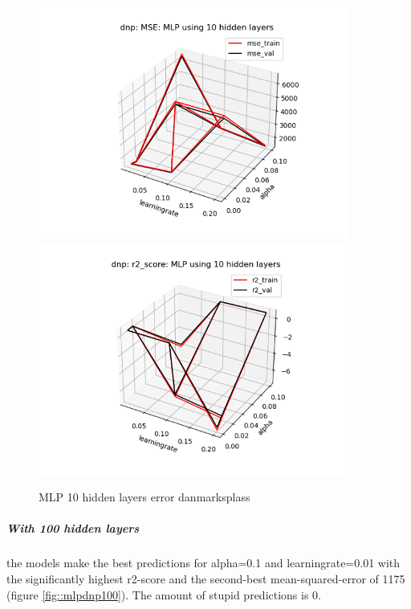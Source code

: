 \documentclass[12pt,a4paper]{scrartcl}		%
\begin{document}
\begin{figure}[h]
    \centering
    \includegraphics[scale = 1.1]{dnp_mlp_mse_10.png}
    \includegraphics[scale = 1.1]{dnp_mlp_r2_10.png}
    \caption{MLP 10 hidden layers error danmarksplass}
    \label{fig::mlpdnp10}
\end{figure}

\subparagraph{With 100 hidden layers}
the models make the best predictions for alpha=0.1 and learningrate=0.01 with the significantly highest r2-score and the second-best mean-squared-error of 1175
(figure \ref{fig::mlpdnp100}). 
The amount of stupid predictions is 0. 
\end{document}
